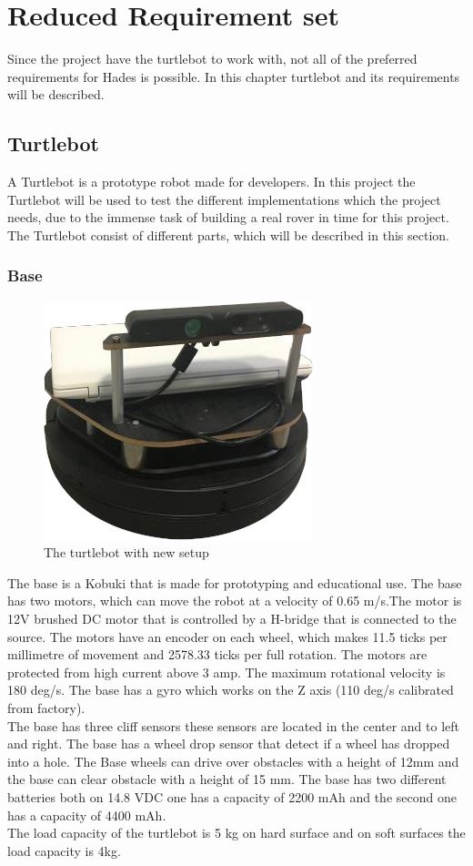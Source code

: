 \chapter{Reduced Requirement set} \label{ch:Reduced Requirement Set}
Since the project have the turtlebot to work with, not all of the preferred requirements for Hades is possible. In this chapter turtlebot and its requirements will be described.

\section{Turtlebot} %
A Turtlebot is a prototype robot made for developers. In this project the Turtlebot will be used to test the different implementations which the project needs, due to the immense task of building a real rover in time for this project.\\
The Turtlebot consist of different parts, which will be described in this section.

\subsection{Base} %
\begin{figure}[h]
    \centering
    \includegraphics[width=.5\textwidth]{figures/turtlebot001.png}
    \caption{The turtlebot with new setup} 
    \label{fig:turtlebot} 
\end{figure}
The base is a Kobuki that is made for prototyping and educational use. The base has two motors, which can move the robot at a velocity of 0.65 m/s.The motor is 12V brushed DC motor that is controlled by a H-bridge that is connected to the source. The motors have an encoder on each wheel, which makes 11.5 ticks per millimetre of movement and 2578.33 ticks per full rotation. The motors are protected from high current above 3 amp. The maximum rotational velocity is 180 deg/s. The base has a gyro which works on the Z axis (110 deg/s calibrated from factory).\\
The base has three cliff sensors these sensors are located in the center and to left and right. The base has a wheel drop sensor that detect if a wheel has dropped into a hole. The Base wheels can drive over obstacles with a height of 12mm and the base can clear obstacle with a height of 15 mm. The base has two different batteries both on 14.8 VDC one has a capacity of 2200 mAh and the second one has a capacity of 4400 mAh.\\ 
The load capacity of the turtlebot is 5 kg on hard surface and on soft surfaces the load capacity is 4kg\cite{Base}.

